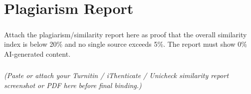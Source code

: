 \chapter*{Plagiarism Report}
\paragraph{}Attach the plagiarism/similarity report here as proof that the overall similarity index is below 20\% and no single source exceeds 5\%. The report must show 0\% AI-generated content.
\paragraph{}\textit{(Paste or attach your Turnitin / iThenticate / Unicheck similarity report screenshot or PDF here before final binding.)}
